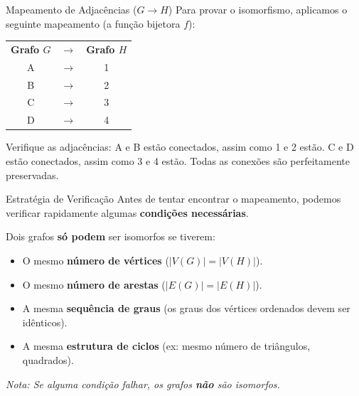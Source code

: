 \documentclass[9pt]{beamer}
\begin{document}
\begin{frame}{Mapeamento de Adjacências ($G \rightarrow H$)}
    Para provar o isomorfismo, aplicamos o seguinte mapeamento (a função bijetora $f$):
    \vspace{0.5cm}
    \begin{center}
        \begin{tabular}{c c c}
            \textbf{Grafo $G$} & $\rightarrow$ & \textbf{Grafo $H$} \\
            A & $\rightarrow$ & 1 \\
            B & $\rightarrow$ & 2 \\
            C & $\rightarrow$ & 3 \\
            D & $\rightarrow$ & 4 \\
        \end{tabular}
    \end{center}
    \vspace{0.5cm}
    Verifique as adjacências: A e B estão conectados, assim como 1 e 2 estão. C e D estão conectados, assim como 3 e 4 estão. Todas as conexões são perfeitamente preservadas.
\end{frame}

\begin{frame}{Estratégia de Verificação}
    Antes de tentar encontrar o mapeamento, podemos verificar rapidamente algumas \textbf{condições necessárias}.
    
    Dois grafos \textbf{só podem} ser isomorfos se tiverem:
    \begin{itemize}
        \item O mesmo \textbf{número de vértices} ($|V(G)| = |V(H)|$).
        \item O mesmo \textbf{número de arestas} ($|E(G)| = |E(H)|$).
        \item A mesma \textbf{sequência de graus} (os graus dos vértices ordenados devem ser idênticos).
        \item A mesma \textbf{estrutura de ciclos} (ex: mesmo número de triângulos, quadrados).
    \end{itemize}
    \vspace{0.3cm}
    \textit{Nota: Se alguma condição falhar, os grafos \textbf{não} são isomorfos.}
\end{frame}
\end{document}
